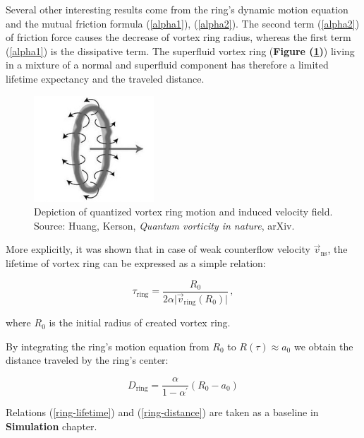Several other interesting results come from the ring's dynamic motion equation and the mutual friction formula (\ref{alpha1}), (\ref{alpha2}). The second term (\ref{alpha2}) of friction force causes the decrease of vortex ring radius, whereas the first term (\ref{alpha1}) is the dissipative term. The superfluid vortex ring (\textbf{Figure (\ref{vortex-ring})}) living in a mixture of a normal and superfluid component has therefore a limited lifetime expectancy and the traveled distance.

\begin{figure}[h]
	\centering
	\includegraphics[width=0.4\textwidth]{graphics/theory/vortex-ring}
	\caption{Depiction of quantized vortex ring motion and induced velocity field. Source: Huang, Kerson, \textit{Quantum vorticity in nature}, arXiv.}
	\label{vortex-ring}
\end{figure}

More explicitly, it was shown \cite{donnelly_book} that in case of weak counterflow velocity $\vec{v}_{\text{ns}}$, the lifetime of vortex ring can be expressed as a simple relation:

\begin{equation}
\tau_{\text{ring}} = \frac{R_0}{2 \alpha \vert \vec{v}_{\text{ring}}(R_0)\vert}\,,
\label{ring-lifetime}
\end{equation}

where $R_0$ is the initial radius of created vortex ring.

By integrating the ring's motion equation from $R_0$ to $R(\tau) \approx a_0$ we obtain the distance traveled by the ring's center:

\begin{equation}
D_{\text{ring}} = \frac{\alpha}{1 - \alpha^{\prime}} (R_0 - a_0)
\label{ring-distance}
\end{equation}

Relations (\ref{ring-lifetime}) and (\ref{ring-distance}) are taken as a baseline in \textbf{Simulation} chapter.
\newpage


